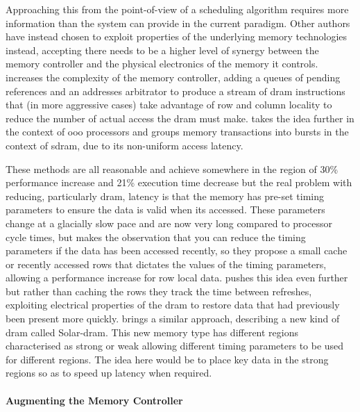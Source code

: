 Approaching this from the point-of-view of a scheduling algorithm requires more information than the system can provide in the current paradigm. Other authors have instead chosen to exploit properties of the underlying memory technologies instead, accepting there needs to be a higher level of synergy between the memory controller and the physical electronics of the memory it controls. \citet{rixnerMemoryAccessScheduling2000} increases the complexity of the memory controller, adding a queues of pending references and an addresses arbitrator to produce a stream of \gls{dram} instructions that (in more aggressive cases) take advantage of row and column locality to reduce the number of actual access the \gls{dram} must make. \citet{shaoBurstSchedulingAccess2007} takes the idea further in the context of \gls{ooo} processors and groups memory transactions into bursts in the context of \gls{sdram}, due to its non-uniform access latency. 

These methods are all reasonable and achieve somewhere in the region of 30\% performance increase \cite{rixnerMemoryAccessScheduling2000} and 21\% execution time decrease \cite{shaoBurstSchedulingAccess2007} but the real problem with reducing, particularly \gls{dram}, latency is that the memory has pre-set timing parameters to ensure the data is valid when its accessed. These parameters change at a glacially slow pace and are now very long compared to processor cycle times, but \citet{hassanChargeCacheReducingDRAM2016} makes the observation that you can reduce the timing parameters if the data has been accessed recently, so they propose a small cache or recently accessed rows that dictates the values of the timing parameters, allowing a performance increase for row local data. \citet{shinDRAMLatencyOptimizationInspired2016} pushes this idea even further but rather than caching the rows they track the time between refreshes, exploiting electrical properties of the \gls{dram} to restore data that had previously been present more quickly. \citet{kimSolarDRAMReducingDRAM2018} brings a similar approach, describing a new kind of \gls{dram} called Solar-\gls{dram}. This new memory type has different regions characterised as strong or weak allowing different timing parameters to be used for different regions. The idea here would be to place key data in the strong regions so as to speed up latency when required. 

\paragraph{Augmenting the Memory Controller}


